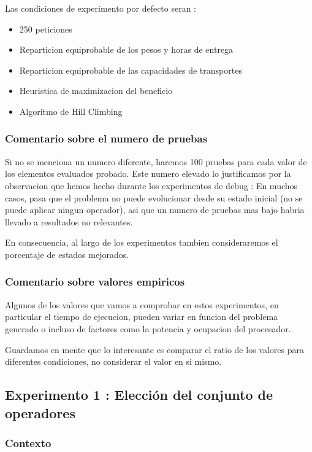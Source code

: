 \documentclass{article}
\begin{document}
Las condiciones de experimento por defecto seran :
\begin{itemize}
\item 250 peticiones
\item Reparticion equiprobable de los pesos y horas de entrega
\item Reparticion equiprobable de las capacidades de transportes
\item Heuristica de maximizacion del beneficio
\item Algoritmo de Hill Climbing
\end{itemize}

\subsubsection{Comentario sobre el numero de pruebas}

Si no se menciona un numero diferente, haremos 100 pruebas para cada valor de
los elementos evaluados probado. Este numero elevado lo justificamos por la
observacion que hemos hecho durante los experimentos de debug : En muchos casos,
pasa que el problema no puede evolucionar desde su estado inicial (no se puede
aplicar ningun operador), asi que un numero de pruebas mas bajo habria llevado a
resultados no relevantes.

En consecuencia, al largo de los experimentos tambien consideraremos el
porcentaje de estados mejorados.

\subsubsection{Comentario sobre valores empiricos}

Algunos de los valores que vamos a comprobar en estos experimentos, en
particular el tiempo de ejecucion, pueden variar en funcion del problema
generado o incluso de factores como la potencia y ocupacion del procesador.

Guardamos en mente que lo interesante es comparar el ratio de los valores para
diferentes condiciones, no considerar el valor en si mismo.

\subsection{Experimento 1 : Elección del conjunto de operadores}

\subsubsection{Contexto}
\end{document}
